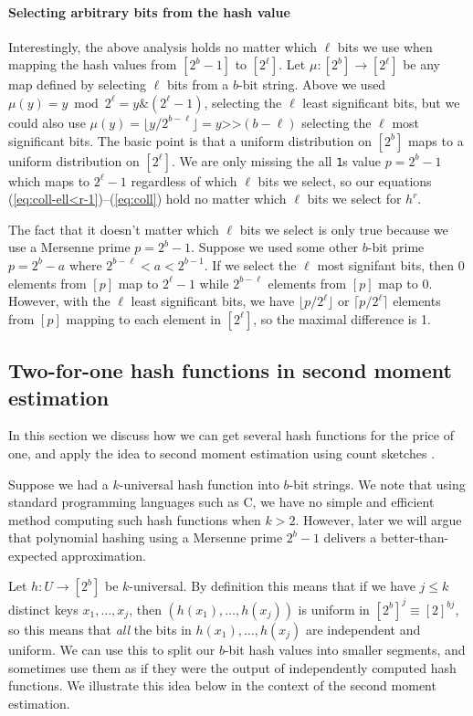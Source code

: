 \documentclass[12pt]{article}
\newcommand{\floor}[1]{\lfloor {#1} \rfloor}
\newcommand{\req}[1]{(\ref{#1})}
\newcommand\fct\rightarrow
\newcommand\ceil[1]{\lceil {#1}\rceil}
\begin{document}
\paragraph{Selecting arbitrary bits from the hash value}
Interestingly, the above analysis holds no matter which $\ell$ bits we
use when mapping the hash values from $[2^b-1]$ to $[2^\ell]$.  Let
$\mu:[2^b]\fct[2^\ell]$ be any map defined by selecting $\ell$ bits
from a $b$-bit string. Above we used
$\mu(y)=y\bmod 2^\ell=y\texttt\& (2^\ell-1)$,
selecting the $\ell$ least significant bits, but we could
also use $\mu(y)=\floor{y/2^{b-\ell}}=y\texttt{>>}(b-\ell)$ selecting
the $\ell$ most significant bits. The basic point is that a uniform
distribution on $[2^b]$ maps to a uniform distribution on
$[2^\ell]$. We are only missing the all \texttt1s value $p=2^b-1$ which maps to $2^\ell-1$
regardless of which $\ell$ bits we select, so our equations
\req{eq:coll-ell<r-1}--\req{eq:coll} hold no matter which $\ell$
bits we select for $h^r$.

The fact that it doesn't matter which $\ell$ bits we select is only
true because we use a Mersenne prime $p=2^b-1$. Suppose we used some
other $b$-bit prime $p=2^b-a$ where $2^{b-\ell}<a<2^{b-1}$. If we
select the $\ell$ most signifant bits, then $0$ elements from $[p]$
map to $2^\ell-1$ while $2^{b-\ell}$ elements from $[p]$ map to $0$. However,
with the $\ell$ least significant bits, we have $\floor{p/2^\ell}$ or
$\ceil{p/2^\ell}$ elements from $[p]$ mapping to each element in
$[2^\ell]$, so the maximal difference is 1.





\subsection{Two-for-one hash functions in second moment estimation}
In this section we discuss how we can get several hash functions for
the price of one, and apply the idea to second moment estimation using
count sketches \cite{charikar04count-sketch}.

Suppose we had a $k$-universal hash function into $b$-bit strings.
We note that using standard programming languages such as C, we have
no simple and efficient method computing such hash
functions when $k>2$. However, later we will argue that polynomial
hashing using a Mersenne prime $2^b-1$ delivers a better-than-expected
approximation.

Let $h:U\fct [2^b]$ be $k$-universal. By definition this
means that if we have $j\leq k$ distinct keys $x_1,\ldots,x_j$, then
$(h(x_1),\ldots,h(x_j))$ is uniform in $[2^b]^j\equiv [2]^{bj}$,
so this means that \emph{all} the bits in $h(x_1),\ldots,h(x_j)$ are
independent and uniform. We can use this to split our $b$-bit hash
values into smaller segments, and sometimes use them as if
they were the output of independently computed hash functions.
We illustrate this idea below in the context of the second moment estimation.
\end{document}
